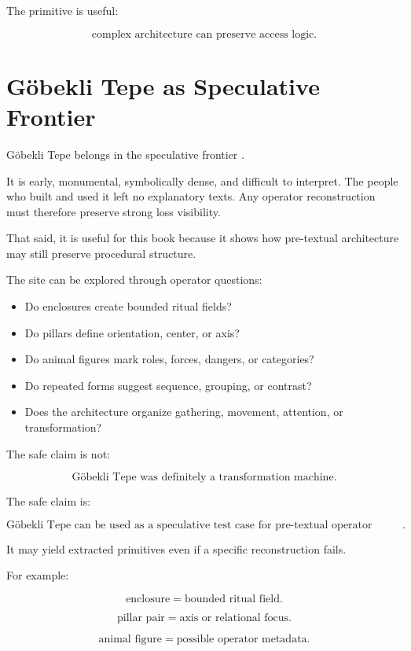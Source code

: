 \documentclass[11pt]{book}
\begin{document}
The primitive is useful:

\[
\text{complex architecture can preserve access logic}.
\]

\section{Göbekli Tepe as Speculative Frontier}

G\"obekli Tepe belongs in the speculative frontier \cite{Schmidt2012GobekliTepe,Clare2020GobekliTepe}.

It is early, monumental, symbolically dense, and difficult to interpret. The people who built and used it left no explanatory texts. Any operator reconstruction must therefore preserve strong loss visibility.

That said, it is useful for this book because it shows how pre-textual architecture may still preserve procedural structure.

The site can be explored through operator questions:

\begin{itemize}
    \item Do enclosures create bounded ritual fields?
    \item Do pillars define orientation, center, or axis?
    \item Do animal figures mark roles, forces, dangers, or categories?
    \item Do repeated forms suggest sequence, grouping, or contrast?
    \item Does the architecture organize gathering, movement, attention, or transformation?
\end{itemize}

The safe claim is not:

\[
\text{Göbekli Tepe was definitely a transformation machine}.
\]

The safe claim is:

\[
\text{Göbekli Tepe can be used as a speculative test case for pre-textual operator architecture}.
\]

It may yield extracted primitives even if a specific reconstruction fails.

For example:

\[
\text{enclosure} = \text{bounded ritual field}.
\]

\[
\text{pillar pair} = \text{axis or relational focus}.
\]

\[
\text{animal figure} = \text{possible operator metadata}.
\]
\end{document}
